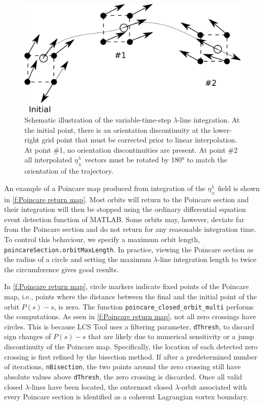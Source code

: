 \documentclass[5p]{elsarticle}
\begin{document}
\begin{figure}
\begin{center}
\includegraphics[width=.475\textwidth]{graphics/variable_step_integration}
\end{center}
\caption{Schematic illustration of the variable-time-step $\lambda$-line integration. At the initial point, there is an orientation discontinuity at the lower-right grid point that must be corrected prior to linear interpolation. At point \#1, no orientation discontinuities are present. At point \#2 all interpolated $\eta_\pm^\lambda$ vectors must be rotated by 180° to match the orientation of the trajectory.}
\label{f:variable step integration}
\end{figure}

An example of a Poincare map produced from integration of the $\eta_\pm^\lambda$ field is shown in \cref{f:Poincare return map}. Most orbits will return to the Poincare section and their integration will then be stopped using the ordinary differential equation event detection function of MATLAB. Some orbits may, however, deviate far from the Poincare section and do not return for any reasonable integration time. To control this behaviour, we specify a maximum orbit length, \lstinline!poincareSection.orbitMaxLength!. In practice, viewing the Poincare section as the radius of a circle and setting the maximum $\lambda$-line integration length to twice the circumference gives good results.

In \cref{f:Poincare return map}, circle markers indicate fixed points of the Poincare map, i.e., points where the distance between the final and the initial point of the orbit $P(s) - s$, is zero. The function \lstinline!poincare_closed_orbit_multi! performs the computations. As seen in \cref{f:Poincare return map}, not all zero crossings have circles. This is because LCS Tool uses a filtering parameter, \lstinline!dThresh!, to discard sign changes of $P(s) - s$ that are likely due to numerical sensitivity or a jump discontinuity of the Poincare map. Specifically, the location of each detected zero crossing is first refined by the bisection method. If after a predetermined number of iterations, \lstinline!nBisection!, the two points around the zero crossing still have absolute values above \lstinline!dThresh!, the zero crossing is discarded.  Once all valid closed $\lambda$-lines have been located, the outermost closed $\lambda$-orbit associated with every Poincare section is identified as a coherent Lagrangian vortex boundary.
\end{document}
